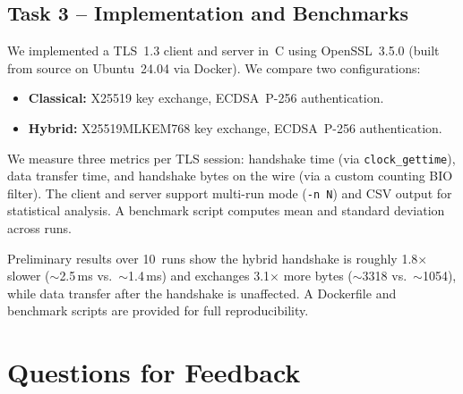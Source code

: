 \documentclass[11pt,a4paper]{article}
\begin{document}
\subsection*{Task 3 -- Implementation and Benchmarks}

We implemented a TLS~1.3 client and server in~C using OpenSSL~3.5.0 (built from source on Ubuntu~24.04 via Docker). We compare two configurations:

\begin{itemize}[nosep]
    \item \textbf{Classical:} X25519 key exchange, ECDSA~P-256 authentication.
    \item \textbf{Hybrid:} X25519MLKEM768 key exchange, ECDSA~P-256 authentication.
\end{itemize}

We measure three metrics per TLS session: handshake time (via \texttt{clock\_gettime}), data transfer time, and handshake bytes on the wire (via a custom counting BIO filter). The client and server support multi-run mode (\texttt{-n~N}) and CSV output for statistical analysis. A benchmark script computes mean and standard deviation across runs.

Preliminary results over 10~runs show the hybrid handshake is roughly 1.8$\times$ slower ($\sim$2.5\,ms vs.\ $\sim$1.4\,ms) and exchanges 3.1$\times$ more bytes ($\sim$3318 vs.\ $\sim$1054), while data transfer after the handshake is unaffected. A Dockerfile and benchmark scripts are provided for full reproducibility.

\section{Questions for Feedback}
\end{document}
